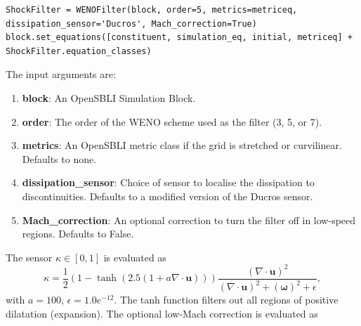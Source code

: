\documentclass[11pt]{article}
\begin{document}
\begin{lstlisting}
ShockFilter = WENOFilter(block, order=5, metrics=metriceq, dissipation_sensor='Ducros', Mach_correction=True)
block.set_equations([constituent, simulation_eq, initial, metriceq] + ShockFilter.equation_classes)
\end{lstlisting}

The input arguments are:
\begin{enumerate}
\item{\textbf{block}: An OpenSBLI Simulation Block.}
\item{\textbf{order}: The order of the WENO scheme used as the filter (3, 5, or 7).}
\item{\textbf{metrics}: An OpenSBLI metric class if the grid is stretched or curvilinear. Defaults to none.}
\item{\textbf{dissipation\_sensor}: Choice of sensor to localise the dissipation to discontinuities. Defaults to a modified version of the Ducros sensor.}
\item{\textbf{Mach\_correction}: An optional correction to turn the filter off in low-speed regions. Defaults to False.}
\end{enumerate}
The sensor $\kappa \in [0,1]$ is evaluated as
\begin{equation}\label{ducros}
\kappa = \frac{1}{2} \left(1 - \tanh{\left(2.5\left(1 + a \nabla \cdot \mathbf { u }\right)\right)} \right) \frac { ( \nabla \cdot \mathbf { u } ) ^ { 2 } } { ( \nabla \cdot \mathbf { u } ) ^ { 2 } + ( \mathbf{\omega} ) ^ { 2 } + \epsilon },
\end{equation}
with $a=100$, $\epsilon = 1.0e^{-12}$. The tanh function filters out all regions of positive dilatation (expansion). The optional low-Mach correction is evaluated as
\end{document}
